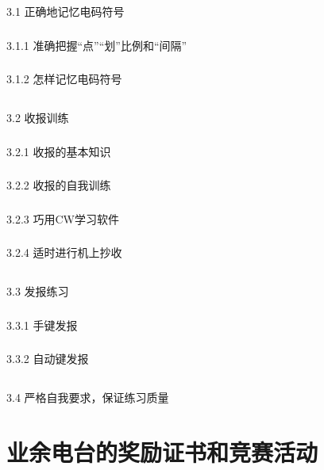 \documentclass[12pt,UTF8]{ctexbook}
\begin{document}
\section{}3.1 正确地记忆电码符号
\subsection{}3.1.1 准确把握“点”“划”比例和“间隔”
\subsection{}3.1.2 怎样记忆电码符号
\section{}3.2 收报训练
\subsection{}3.2.1 收报的基本知识
\subsection{}3.2.2 收报的自我训练
\subsection{}3.2.3 巧用CW学习软件
\subsection{}3.2.4 适时进行机上抄收
\section{}3.3 发报练习
\subsection{}3.3.1 手键发报
\subsection{}3.3.2 自动键发报
\section{}3.4 严格自我要求，保证练习质量

\chapter{业余电台的奖励证书和竞赛活动}
\end{document}
